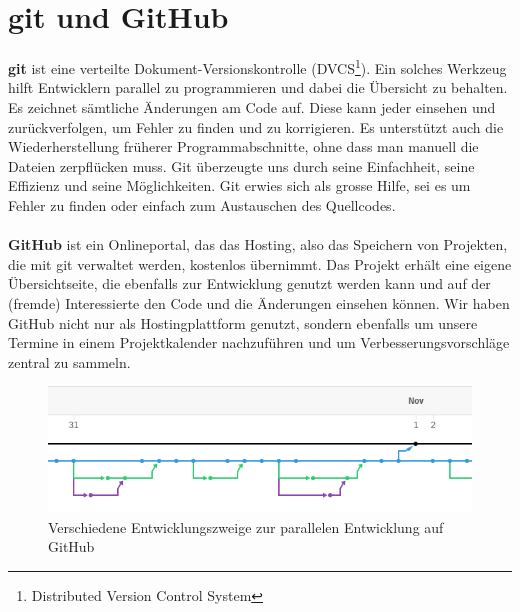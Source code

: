 \documentclass[11pt,a4paper]{scrbook}
\begin{document}
\section{git und GitHub}
\textbf{git} ist eine verteilte Dokument-Versionskontrolle (DVCS\footnote{Distributed Version Control System}). Ein solches Werkzeug hilft Entwicklern parallel zu programmieren und dabei die Übersicht zu behalten. Es zeichnet sämtliche Änderungen am Code auf.  Diese kann jeder einsehen und zurückverfolgen, um Fehler zu finden und zu korrigieren. Es unterstützt auch die Wiederherstellung früherer Programmabschnitte, ohne dass man
manuell die Dateien zerpflücken muss. 
Git überzeugte uns durch seine Einfachheit, seine Effizienz und seine Möglichkeiten.
Git erwies sich als grosse Hilfe, sei es um Fehler zu finden oder einfach zum Austauschen des Quellcodes.
\\
\\
\textbf{GitHub} ist ein
Onlineportal, das das Hosting, also das Speichern von Projekten, die mit git verwaltet werden, kostenlos übernimmt. Das Projekt erhält eine eigene Übersichtseite,
die ebenfalls zur Entwicklung genutzt werden kann und auf der (fremde) Interessierte den Code und die Änderungen einsehen können. Wir haben GitHub nicht nur
als Hostingplattform genutzt, sondern ebenfalls um unsere Termine in einem Projektkalender nachzuführen und um Verbesserungsvorschläge zentral zu sammeln.
\begin{figure}
\centering
\includegraphics[scale=1]{img/branches.png}
\caption{Verschiedene Entwicklungszweige zur parallelen Entwicklung auf GitHub}
\label{fig:branches}
\end{figure}
\end{document}
